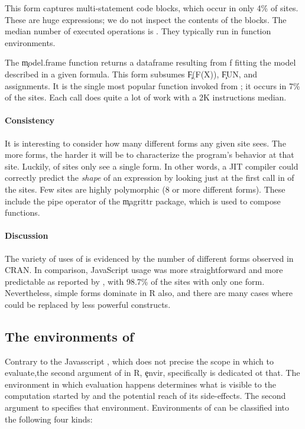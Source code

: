 \documentclass[review,screen,acmsmall,anonymous=true]{acmart}
\begin{document}
\medskip\noindent{} This form captures multi-statement
code blocks, which occur in only 4\% of sites. These are huge expressions; we
do not inspect the contents of the blocks. The median number of executed operations
is \packageMinimizedmedianoperationsjRnd. They typically run in function
environments.

\medskip\noindent{} The \c{model.frame} function
returns a dataframe resulting from f fitting the model described in a given
formula. This form subsumes \c{F(F(X))}, \c{FUN}, and assignments. It is the
single most popular function invoked from \eval; it occurs in 7\% of the sites.
Each call does quite a lot of work with a 2K instructions median.

\paragraph{Consistency} It is interesting to consider how many different
forms any given site sees. The more forms, the harder it will be to characterize
the program's behavior at that site. Luckily, \packageNbOneMinimizedPercent
of sites only see a single form.  In other words, a JIT compiler could correctly predict the \emph{shape} of an expression by looking just at the first call in \packageNbOneMinimizedPercent of the sites.  Few sites are highly polymorphic (8 or more different forms). These include the pipe operator of the \c{magrittr} package, which is used to compose functions.

\paragraph{Discussion} The variety of uses of \eval is evidenced by the number
of different forms observed in CRAN. In comparison, JavaScript \eval usage was more straightforward and more predictable as reported by \citet{oopsla12b}, with 98.7\% of the sites with only one form. Nevertheless, simple forms dominate in R also, and there are many cases where \eval could be replaced by less powerful constructs.


\subsection{The environments of \eval}\label{sec:env}

Contrary to the Javasscript \eval, which does not precise the scope in which to evaluate,the second argument of \eval in R, \c{envir}, specifically is dedicated ot that. 
The environment in which evaluation happens determines what is visible to the
computation started by \eval and the potential reach of its side-effects. The
second argument to \eval specifies that environment. Environments of \eval can be
classified into the following four kinds:
\end{document}
